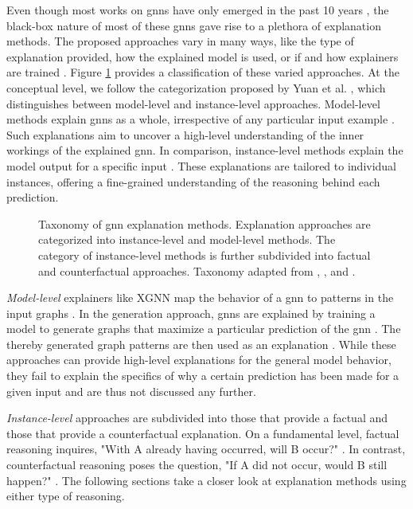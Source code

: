 Even though most works on \glspl{gnn} have only emerged in the past 10 years \cite{wu_comprehensive_2021}, the black-box nature of most of these \glspl{gnn} gave rise to a plethora of explanation methods. The proposed approaches vary in many ways, like the type of explanation provided, how the explained model is used, or if and how explainers are trained \cite{kakkad_survey_2023}. Figure \ref{f_taxonomy_explainers} provides a classification of these varied approaches. At the conceptual level, we follow the categorization proposed by Yuan et al. \cite{yuan_explainability_2020}, which distinguishes between model-level and instance-level approaches. Model-level methods explain \glspl{gnn} as a whole, irrespective of any particular input example \cite{yuan_explainability_2020}. Such explanations aim to uncover a high-level understanding of the inner workings of the explained \gls{gnn}. In comparison, instance-level methods explain the model output for a specific input \cite{yuan_explainability_2020}. These explanations are tailored to individual instances, offering a fine-grained understanding of the reasoning behind each prediction.

\begin{figure}[ht]
    \centering
    
    \caption{Taxonomy of \gls{gnn} explanation methods. Explanation approaches are categorized into instance-level and model-level methods. The category of instance-level methods is further subdivided into factual and counterfactual approaches. Taxonomy adapted from \cite{yuan_explainability_2020}, \cite{prado-romero_survey_2023}, and \cite{kakkad_survey_2023}.}
    \label{f_taxonomy_explainers}
\end{figure}

\textit{Model-level} explainers like XGNN \cite{yuan_xgnn_2020} map the behavior of a \gls{gnn} to patterns in the input graphs \cite{yuan_explainability_2020}. In the generation approach, \glspl{gnn} are explained by training a model to generate graphs that maximize a particular prediction of the \gls{gnn} \cite{yuan_explainability_2020, yuan_xgnn_2020}. The thereby generated graph patterns are then used as an explanation \cite{yuan_xgnn_2020}. While these approaches can provide high-level explanations for the general model behavior, they fail to explain the specifics of why a certain prediction has been made for a given input and are thus not discussed any further.

\textit{Instance-level} approaches are subdivided into those that provide a factual and those that provide a counterfactual explanation. On a fundamental level, factual reasoning inquires, "With A already having occurred, will B occur?" \cite{quelhas_relation_2018, tan_learning_2022}. In contrast, counterfactual reasoning poses the question, "If A did not occur, would B still happen?" \cite{quelhas_relation_2018, tan_learning_2022}. The following sections take a closer look at explanation methods using either type of reasoning.

